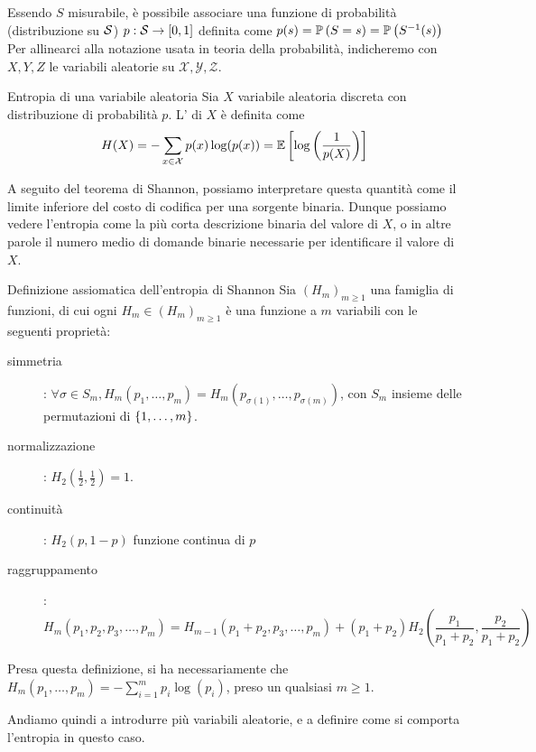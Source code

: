 Essendo \(S\) misurabile, è possibile associare una funzione  di probabilità (distribuzione su \(\mathcal{S}\)) \(p: \mathcal{S} \to [0,1]\) definita come \(p(s) = \Prob[S=s] = \Prob[S^{-1}(s)]\)
Per allinearci alla notazione usata in teoria della probabilità, indicheremo con \(X,Y,Z\) le variabili aleatorie su \(\mathcal{X}, \mathcal{Y}, \mathcal{Z}\).

\begin{definition}{Entropia di una variabile aleatoria}
  Sia \(X\) variabile aleatoria discreta con distribuzione di probabilità \(p\).
  L' di \(X\) è definita come
  \[H(X) = -\sum_{x \in \mathcal{X}} p(x) \log( p(x)) = \EV{\log\left(\frac{1}{p(X)}\right)}\]
\end{definition}

A seguito del teorema di Shannon, possiamo interpretare questa quantità come il limite inferiore del costo di codifica per una sorgente binaria.
Dunque possiamo vedere l'entropia come la più corta descrizione binaria del valore di \(X\), o in altre parole il numero medio di domande binarie necessarie per identificare il valore di \(X\).

\begin{definition}{Definizione assiomatica dell'entropia di Shannon}
  Sia \({(H_m)}_{m \geq 1}\) una famiglia di funzioni, di cui ogni \(H_m \in {(H_m)}_{m \geq 1}\) è una funzione a \(m\) variabili con le seguenti proprietà:
  \begin{description}
    \item[simmetria]: \(\forall \sigma \in S_m, H_m(p_1,\ldots,p_m) = H_m(p_{\sigma(1)},\ldots,p_{\sigma(m)})\), con \( S_m\) insieme delle permutazioni di \(\set{1,\ldots,m}\).
    \item[normalizzazione]: \(H_2\left(\frac{1}{2}, \frac{1}{2}\right) = 1\).
    \item[continuità]: \(H_2(p,1-p)\) funzione continua di \(p\)
    \item[raggruppamento]:
    \[H_m(p_1,p_2,p_3,\ldots,p_m) = H_{m-1}(p_1 + p_2,p_3,\ldots,p_m)+(p_1+p_2)H_2(\frac{p_1}{p_1+p_2},\frac{p_2}{p_1+p_2})\]
  \end{description}
\end{definition}

Presa questa definizione, si ha necessariamente che \( H_m(p_1,\ldots,p_m) = - \sum_{i=1}^{m} p_i \log(p_i)\), preso un qualsiasi \(m\geq 1\).

Andiamo quindi a introdurre più variabili aleatorie, e a definire come si comporta l'entropia in questo caso.

